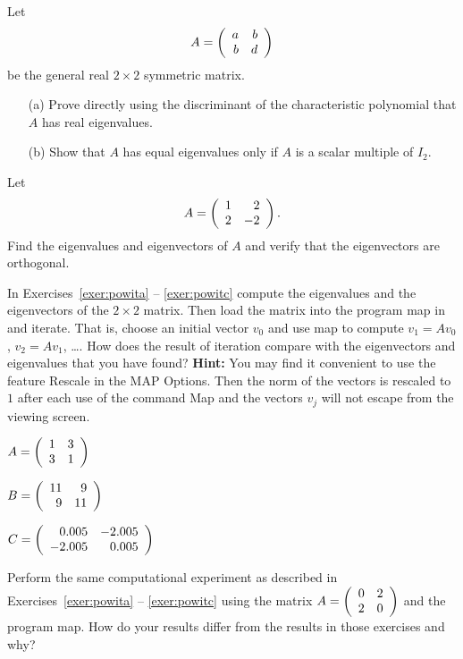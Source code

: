 \documentclass{ximera}
\begin{document}
\EXER

\TEXER

\begin{exercise} \label{c7.7.1}
Let
\[
A = \left(\begin{array}{rr} a & b\\ b &d\end{array}\right)
\]
be the general real $2\times 2$ symmetric matrix.
\begin{itemize}
\item[(a)]  Prove directly using the discriminant of the characteristic
polynomial that $A$ has real eigenvalues.
\item[(b)]  Show that $A$ has equal eigenvalues only if $A$ is a scalar
multiple of $I_2$.
\end{itemize}
\end{exercise}

\begin{exercise} \label{c7.7.2}
Let
\[
A=\left(\begin{array}{rr} 1 & 2\\ 2 &-2\end{array}\right).
\]
Find the eigenvalues and eigenvectors of $A$ and verify that the eigenvectors
are orthogonal.
\end{exercise}

\CEXER

\noindent In Exercises~\ref{exer:powita} -- \ref{exer:powitc}
compute the eigenvalues and the eigenvectors of the 
$2\times 2$ matrix.  Then load the matrix into the program {\sf map}
 in \Matlab and iterate.  That is, choose an initial
vector $v_0$ and use {\sf map} to compute $v_1=Av_0$, $v_2=Av_1$, \ldots.
How does the result of iteration compare with the eigenvectors and
eigenvalues that you have found?
{\bf Hint:} You may find it convenient to use the feature {\sf Rescale} in
the {\sf MAP Options}.  Then the norm of the vectors is rescaled to $1$
after each use of the command {\sf Map} and the vectors $v_j$ will not
escape from the viewing screen.
\begin{exercise}  \label{exer:powita}
$A=\left(\begin{array}{rr} 1 & 3\\ 3 &1\end{array}\right)$
\end{exercise}
\begin{exercise}  \label{exer:powitb}
$B=\left(\begin{array}{rr} 11 & 9\\ 9 &11\end{array}\right)$
\end{exercise}
\begin{exercise}  \label{exer:powitc}
$C=\left(\begin{array}{rr} 0.005 & -2.005\\ -2.005 &0.005\end{array}\right)$
\end{exercise}

\begin{exercise} \label{c7.7.3}
Perform the same computational experiment as described in
Exercises~\ref{exer:powita} -- \ref{exer:powitc} using the matrix
$A=\left(\begin{array}{rr} 0 & 2\\ 2 &0\end{array}\right)$
and the program {\sf map}.  How do your results differ from the results
in those exercises and why?
\end{exercise}
\end{document}
